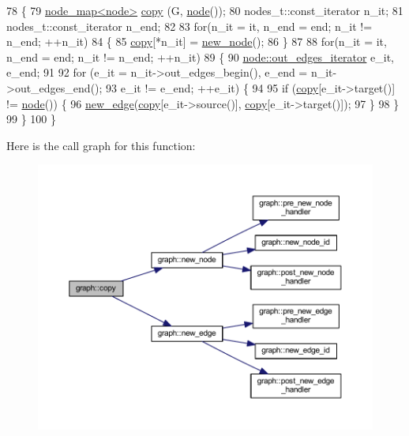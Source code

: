 \begin{DoxyCode}
78 \{
79     \mbox{\hyperlink{classnode__map}{node\_map<node>}} \mbox{\hyperlink{classgraph_abc39d65a6ca3f3165bc71c7125dfd22e}{copy}} (G, \mbox{\hyperlink{classnode}{node}}());    
80     nodes\_t::const\_iterator n\_it;
81     nodes\_t::const\_iterator n\_end;
82 
83     \textcolor{keywordflow}{for}(n\_it = it, n\_end = end; n\_it != n\_end; ++n\_it)
84     \{
85     \mbox{\hyperlink{classgraph_abc39d65a6ca3f3165bc71c7125dfd22e}{copy}}[*n\_it] = \mbox{\hyperlink{classgraph_ab9505335c20558319b6cce25aed23524}{new\_node}}();
86     \}
87 
88     \textcolor{keywordflow}{for}(n\_it = it, n\_end = end; n\_it != n\_end; ++n\_it)
89     \{
90     \mbox{\hyperlink{classnode_a90e17ed34de55072e8077f4367499a98}{node::out\_edges\_iterator}} e\_it, e\_end;
91     
92     \textcolor{keywordflow}{for} (e\_it = n\_it->out\_edges\_begin(), e\_end = n\_it->out\_edges\_end();
93          e\_it != e\_end; ++e\_it) \{
94 
95         \textcolor{keywordflow}{if} (\mbox{\hyperlink{classgraph_abc39d65a6ca3f3165bc71c7125dfd22e}{copy}}[e\_it->target()] != \mbox{\hyperlink{classnode}{node}}()) \{
96         \mbox{\hyperlink{classgraph_a02a0c3a219f75d68caa408ef339d4a1c}{new\_edge}}(\mbox{\hyperlink{classgraph_abc39d65a6ca3f3165bc71c7125dfd22e}{copy}}[e\_it->source()], \mbox{\hyperlink{classgraph_abc39d65a6ca3f3165bc71c7125dfd22e}{copy}}[e\_it->target()]);
97         \}
98     \}
99     \}    
100 \}
\end{DoxyCode}
Here is the call graph for this function\+:\nopagebreak
\begin{figure}[H]
\begin{center}
\leavevmode
\includegraphics[width=350pt]{classgraph_abc39d65a6ca3f3165bc71c7125dfd22e_cgraph}
\end{center}
\end{figure}
